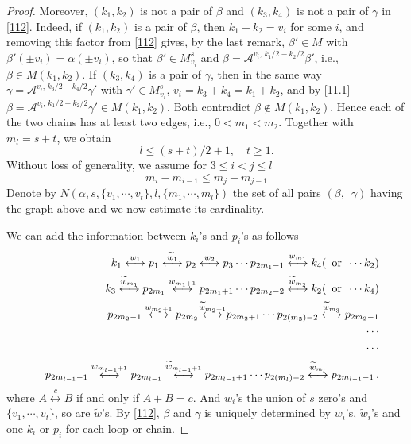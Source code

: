 \documentclass[11pt]{article}
\numberwithin{equation}{section}
\newcommand{\beq}{\begin{equation}}
\newcommand{\eeq}{\end{equation}}
\newcommand{\beqa}{\begin{eqnarray}}
\newcommand{\eeqa}{\end{eqnarray}}
\newcommand\rmor{ \,\,\,{\rm or}\,\,\, }
\newcommand\al{{\alpha}}
\newcommand\be{\beta}
\theoremstyle{definition}
\begin{document}
\begin{proof}
Moreover, $(k_1,k_2)$ is not a pair of $\be$ and $(k_3,k_4)$ is not a pair of $\gamma$ in \eqref{112}. Indeed, if $(k_1,k_2)$ is a pair of $\be$, then $k_1+k_2=v_i$ for some $i$, and removing this factor from \eqref{112} gives, by the last remark, $\be'\in M$ with $\be'(\pm v_i)=\al(\pm v_i)$, so that $\be'\in M^s_{v_i}$ and $\be=\mathcal A^{v_i,\,k_1/2-k_2/2}\be'$, i.e., $\be\in M(k_1,k_2)$. If $(k_3,k_4)$ is a pair of $\gamma$, then in the same way $\gamma=\mathcal A^{v_i,\,k_3/2-k_4/2}\gamma'$ with $\gamma'\in M^s_{v_i}$, $v_i=k_3+k_4=k_1+k_2$, and by \eqref{11.1} $\be=\mathcal A^{v_i,\,k_1/2-k_2/2}\gamma'\in M(k_1,k_2)$. Both contradict $\be\notin M(k_1,k_2)$. Hence each of the two chains has at least two edges, i.e., $0<m_1<m_2$. 
Together with $m_l=s+t$, we obtain
\beq\label{uboundl}
l\leq (s+t)/2+1, \quad t \ge 1.
\eeq
Without loss of generality, we assume  for $3\leq i<j\leq l$
\beq
m_i-m_{i-1}\leq m_j-m_{j-1}
\eeq
Denote by $N(\al, s, \{v_1,\cdots,v_t\}, l, \{m_1,\cdots,m_l\})$ the set of all pairs  $(\beta,\,\,\,\gamma)$ having the graph above
and we now estimate its cardinality. 


We can add the information between $k_i$'s and $p_i$'s as follows
\beqa
&&k_1\stackrel{w_1}{\longleftrightarrow} p_1\stackrel{\widetilde w_1}{\longleftrightarrow} p_2\stackrel{w_2}{\longleftrightarrow} p_3\cdots p_{2m_1-1}\stackrel {w_{m_1}}{\longleftrightarrow} k_4(\rmor \cdots k_2)\\\nonumber
&&k_3\stackrel{\widetilde w_{m_1}}{\longleftrightarrow} p_{2m_1}\stackrel{w_{m_1+1}}{\longleftrightarrow} p_{2m_1+1}\cdots p_{2m_2-2}\stackrel{{\widetilde w_{m_2}}}{\longleftrightarrow} k_2(\rmor \cdots k_4)
\\\nonumber
&&p_{2m_2-1}\stackrel{w_{m_2+1}}{\longleftrightarrow} p_{2m_2}{\stackrel{\widetilde w_{m_2+1}}{\longleftrightarrow}}p_{2m_2+1}\cdots p_{2(m_3)-2}\stackrel{\widetilde w_{m_3}}{\longleftrightarrow} p_{2m_2-1}
\\\nonumber
&&\cdots\\\nonumber
&&\cdots
\\\nonumber
&&p_{2m_{l-1}-1}\stackrel{w_{m_{l-1}+1}}{\longleftrightarrow} p_{2m_{l-1}}\stackrel{\widetilde w_{m_{l-1}+1}}{\longleftrightarrow} p_{2m_{l-1}+1}\cdots p_{2(m_l)-2}\stackrel{\widetilde w_{m_{l}}}{\longleftrightarrow}   p_{2m_{l-1}-1}\, , 
\eeqa
where  $A\stackrel{c}{\longleftrightarrow} B$ if and only if  $A+B=c$. And $w_i$'s the union of $s$ zero's and $\{v_1,\cdots, v_t\}$, so are $\widetilde w$'s. 
By \eqref{112}, $\beta$ and $\gamma$ is uniquely determined by  $w_i$'s, $\widetilde w_i$'s and one $k_i$ or $p_i$ for  each loop or chain. 
\par 


\end{proof}
\end{document}
